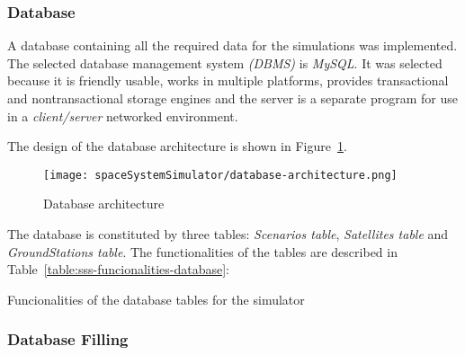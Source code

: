 \subsubsection{Database}

A database containing all the required data for the simulations was
implemented. The selected database management system \emph{(DBMS)} is
\emph{MySQL}. It was selected because it is friendly usable, works in multiple
platforms, provides transactional and nontransactional storage engines and the server is a separate program for use in a \emph{client/server} networked environment.

The design of the database architecture is shown in Figure~\ref{fig:sss-database-architecture}.

\begin{figure}[!h]
\begin{center}
\texttt{[image: spaceSystemSimulator/database-architecture.png]}
\caption{Database architecture}
\label{fig:sss-database-architecture}
\end{center}
\end{figure}

The database is constituted by three tables: \emph{Scenarios table},
\emph{Satellites table} and \emph{GroundStations table}. The functionalities of the tables are described in
Table~\ref{table:sss-funcionalities-database}:

\begin{table}[!htb]
  \centering
  {\small
  
  }
  \caption{Funcionalities of the database tables for the simulator}
  \label{table:sss-funcionalities-database}
\end{table}


\subsubsection{Database Filling}

